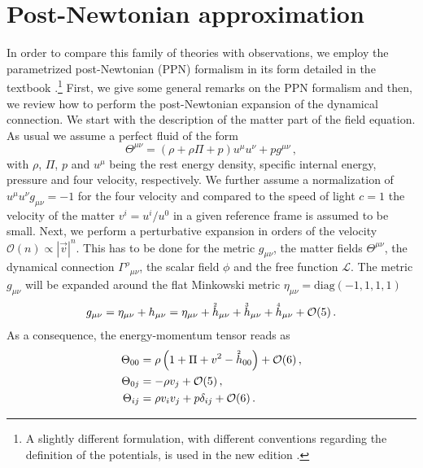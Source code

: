 \documentclass[notitlepage,a4paper,aps,prd,onecolumn,superscriptaddress,nofootinbib,groupedaddress,longbibliography]{revtex4-2}
\newcommand{\order}[2]{\accentset{#2}{#1}}
\begin{document}
\section{Post-Newtonian approximation}\label{sec:ppn}
In order to compare this family of theories with observations, we employ the parametrized post-Newtonian (PPN) formalism in its form detailed in the textbook \cite{Will:1993ns}.\footnote{A slightly different formulation, with different conventions regarding the definition of the potentials, is used in the new edition \cite{Will:2018bme}.} First, we give some general remarks on the PPN formalism and then, we review how to perform the post-Newtonian expansion of the dynamical connection. We start with the description of the matter part of the field equation. As usual we assume a perfect fluid of the form
\begin{equation}\label{eqn:tmunu}
\Theta^{\mu\nu} = (\rho + \rho\Pi + p)u^{\mu}u^{\nu} + pg^{\mu\nu}\,,
\end{equation}
with $\rho$, $\Pi$, $p$ and $u^{\mu}$ being the rest energy density, specific internal energy, pressure and four velocity, respectively. We further assume a normalization of $u^{\mu}u^{\nu}g_{\mu\nu}=-1$ for the four velocity and compared to the speed of light $c=1$ the velocity of the matter $v^i=u^i/u^0$ in a given reference frame is assumed to be small. Next, we perform a perturbative expansion in orders of the velocity $\mathcal{O}(n) \propto |\vec{v}|^n$. This has to be done for the metric $g_{\mu\nu}$, the matter fields $\Theta^{\mu\nu}$, the dynamical connection $\Gamma^{\rho}{}_{\mu\nu}$, the scalar field $\phi$ and the free function $\mathcal{L}$. The metric $g_{\mu\nu}$ will be expanded around the flat Minkowski metric $\eta_{\mu\nu}=\mathrm{diag}(-1,1,1,1)$
\begin{equation}\label{eqn:metricperturb}
g_{\mu\nu}=\eta_{\mu\nu}+h_{\mu\nu}=\eta_{\mu\nu}+\order{h}{2}_{\mu\nu}+\order{h}{3}_{\mu\nu}+\order{h}{4}_{\mu\nu}+\mathcal{O}(5)\,.
\end{equation}
As a consequence, the energy-momentum tensor reads as
\begin{subequations}\label{eqn:energymomentum}
\begin{align}
\Theta_{00} &= \rho\left(1 + \Pi + v^2 - \order{h}{2}_{00}\right) + \mathcal{O}(6)\,,\\
\Theta_{0j} &= -\rho v_j + \mathcal{O}(5)\,,\\
\Theta_{ij} &= \rho v_iv_j + p\delta_{ij} + \mathcal{O}(6)\,.
\end{align}
\end{subequations}
\end{document}
